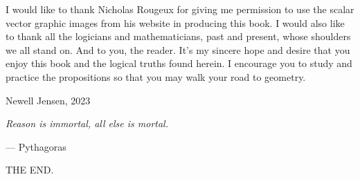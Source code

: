 \documentclass[twoside,11pt]{report}
\begin{document}
I would like to thank Nicholas Rougeux for giving me permission to use the scalar vector graphic images from his website in producing this book.  I would also like to thank all the logicians and mathematicians, past and present, whose shoulders we all stand on.  And to you, the reader.  It's my sincere hope and desire that you enjoy this book and the logical truths found herein.  I encourage you to study and practice the propositions so that you may walk your {\color{cred}{o}}{\color{cblue}{w}}{\color{cyellow}{n}} road to geometry.

\hfill

\begin{flushright}
  Newell Jensen, 2023
\end{flushright}

\newpage

\vspace*{\fill}

\begin{center}
  \textit{Reason is immortal, all else is mortal.}

  \hspace{9em}--- Pythagoras
\end{center}

\vspace*{\fill}

\newpage

\tableofcontents

\newpage










\newpage

\thispagestyle{empty}
\vspace*{\fill}
\begin{center}
  \scshape{\LARGE{THE END.}}
\end{center}
\vspace*{\fill}
\end{document}
